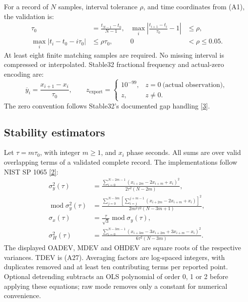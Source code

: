 \documentclass[11pt,a4paper]{article}
\newcommand{\nist}{\href{https://tf.nist.gov/general/pdf/2220.pdf}{[2]}}
\newcommand{\stablemanual}{\href{http://www.stable32.com/Manual154.pdf}{[3]}}
\begin{document}
For a record of \(N\) samples, interval tolerance \(\rho\), and time coordinates
from (A1), the validation is:
\begin{align}
\tau_0&=\frac{t_{N-1}-t_0}{N-1},&
\max_i\left|\frac{t_{i+1}-t_i}{\tau_0}-1\right|&\le\rho, \tag{A22}\\
\max_i|t_i-t_0-i\tau_0|&\le\rho\tau_0,&
0&<\rho\le0.05. \tag{A23}
\end{align}
At least eight finite matching samples are required. No missing interval is
compressed or interpolated. Stable32 fractional frequency and actual-zero
encoding are:
\begin{equation}
\overline y_i=\frac{x_{i+1}-x_i}{\tau_0},\qquad
z_{\mathrm{export}}=
\begin{cases}10^{-99},&z=0\ \text{(actual observation)},\\z,&z\ne0.\end{cases}
\tag{A24}
\end{equation}
The zero convention follows Stable32's documented gap handling \stablemanual.

\subsection{Stability estimators}
Let \(\tau=m\tau_0\), with integer \(m\ge1\), and \(x_i\) phase seconds.
All sums are over valid overlapping terms of a validated complete record.
The implementations follow NIST SP 1065 \nist:
\begin{align}
\sigma_y^2(\tau)&=
\frac{\sum_{i=0}^{N-2m-1}(x_{i+2m}-2x_{i+m}+x_i)^2}
     {2\tau^2(N-2m)}, \tag{A25}\\
\operatorname{mod}\sigma_y^2(\tau)&=
\frac{\displaystyle\sum_{j=0}^{N-3m}
 \left[\sum_{i=j}^{j+m-1}(x_{i+2m}-2x_{i+m}+x_i)\right]^2}
 {2m^2\tau^2(N-3m+1)}, \tag{A26}\\
\sigma_x(\tau)&=\frac{\tau}{\sqrt3}\operatorname{mod}\sigma_y(\tau), \tag{A27}\\
\sigma_H^2(\tau)&=
\frac{\displaystyle\sum_{i=0}^{N-3m-1}
(x_{i+3m}-3x_{i+2m}+3x_{i+m}-x_i)^2}
{6\tau^2(N-3m)}. \tag{A28}
\end{align}
The displayed OADEV, MDEV and OHDEV are square roots of the respective
variances. TDEV is (A27). Averaging factors are log-spaced integers, with
duplicates removed and at least ten contributing terms per reported point.
Optional detrending subtracts an OLS polynomial of order 0, 1 or 2 before
applying these equations; raw mode removes only a constant for numerical
convenience.
\clearpage
\end{document}
